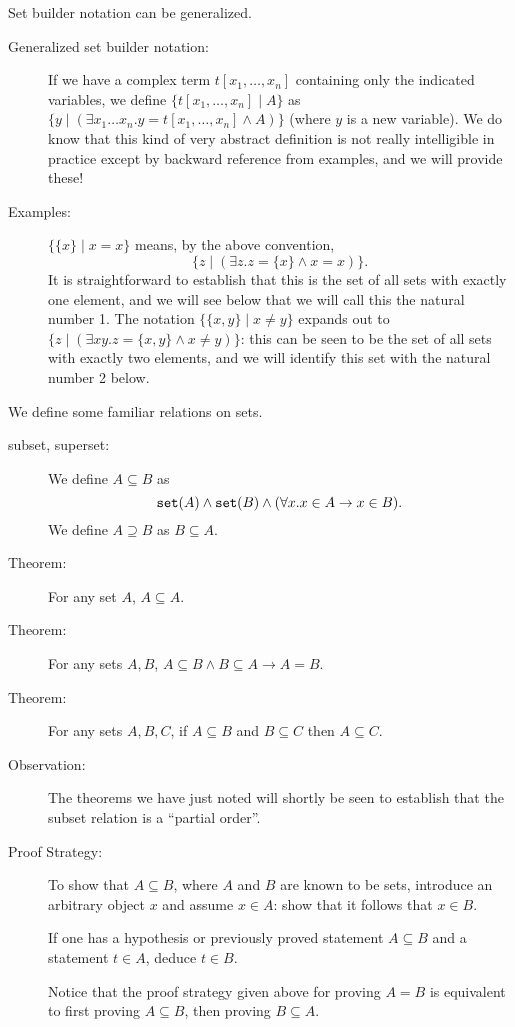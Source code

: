 \documentclass[12pt]{book}
\begin{document}
Set builder notation can be generalized.  

\begin{description}

\item[Generalized set builder notation:] If we have a complex term
$t[x_1,\ldots,x_n]$ containing only the indicated variables, we define
$\{t[x_1,\ldots,x_n] \mid A\}$ as $\{y \mid (\exists x_1\ldots
x_n.y=t[x_1,\ldots,x_n] \wedge A)\}$ (where $y$ is a new variable).
We do know that this kind of very abstract definition is not really
intelligible in practice except by backward reference from examples,
and we will provide these!

\item[Examples:] $\{\{x\}\mid x=x\}$ means, by the above convention,
$$\{z \mid (\exists z.z=\{x\}\wedge x=x)\}.$$  It is straightforward to
establish that this is the set of all sets with exactly one element,
and we will see below that we will call this the natural number 1.
The notation $\{\{x,y\}\mid x \neq y\}$ expands out to $\{z \mid
(\exists xy.z = \{x,y\} \wedge x\neq y)\}$: this can be seen to be the
set of all sets with exactly two elements, and we will identify this
set with the natural number 2 below.

\end{description}


We define some familiar relations on sets.

\begin{description}

\item[subset, superset:] We define $A \subseteq B$ as $${\tt
set}(A)\wedge{\tt set}(B) \wedge (\forall x.x \in A \rightarrow x \in
B).$$  We define $A \supseteq B$ as $B \subseteq A$.

\item[Theorem:] For any set $A$, $A \subseteq A$.

\item[Theorem:]  For any sets $A,B$, $A \subseteq B \wedge B \subseteq A \rightarrow A=B$.

\item[Theorem:] For any sets $A,B,C$, if $A \subseteq B$ and $B
\subseteq C$ then $A \subseteq C$.

\item[Observation:] The theorems we have just noted will shortly be
seen to establish that the subset relation is a ``partial order''.

\item[Proof Strategy:] To show that $A \subseteq B$, where $A$ and $B$
are known to be sets, introduce an arbitrary object $x$ and assume
$x\in A$: show that it follows that $x\in B$.

If one has a hypothesis or previously proved statement $A \subseteq B$ and a statement $t \in A$, deduce $t \in B$.

Notice that the proof strategy given above for
proving $A = B$ is equivalent to first proving $A \subseteq B$, then
proving $B \subseteq A$.

\end{description}
\end{document}

